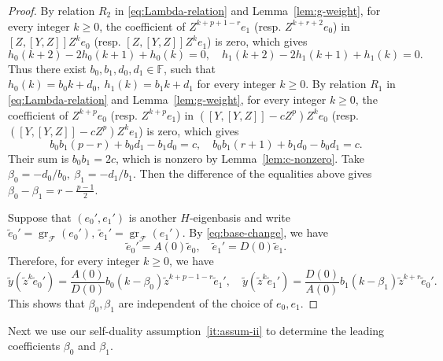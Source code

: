 \documentclass[11pt,a4paper]{article} %
\def\FF{\mathbb{F}}
\def\cF{\mathcal{F}}
\def\gr{\operatorname{gr}}
\begin{document}
\begin{proof}
    By relation $R_2$ in \eqref{eq:Lambda-relation} and Lemma~\ref{lem:g-weight}, for every integer $k\ge0$, the coefficient of $Z^{k+p+1-r}e_1$ (resp. $Z^{k+r+2}e_0$) in $[Z,[Y,Z]]Z^ke_0$ (resp. $[Z,[Y,Z]]Z^ke_1$) is zero, which gives
    \[
    h_0(k+2)-2h_0(k+1)+h_0(k)=0,\quad h_1(k+2)-2h_1(k+1)+h_1(k)=0.
    \]
    Thus there exist $b_0,b_1,d_0,d_1\in\FF$, such that $h_0(k)=b_0k+d_0,~h_1(k)=b_1k+d_1$ for every integer $k\ge0$. By relation $R_1$ in \eqref{eq:Lambda-relation} and Lemma~\ref{lem:g-weight}, for every integer $k\ge0$, the coefficient of $Z^{k+p}e_0$ (resp. $Z^{k+p}e_1$) in $([Y,[Y,Z]]-cZ^p)Z^ke_0$ (resp. $([Y,[Y,Z]]-cZ^p)Z^ke_1$) is zero, which gives
    \[
    b_0b_1(p-r)+b_0d_1-b_1d_0=c,\quad b_0b_1(r+1)+b_1d_0-b_0d_1=c.
    \]
    Their sum is $b_0b_1=2c$, which is nonzero by Lemma~\ref{lem:c-nonzero}. Take $\beta_0=-d_0/b_0,~\beta_1=-d_1/b_1$. Then the difference of the equalities above gives $ \beta_0-\beta_1=r-\frac{p-1}{2}$.

    Suppose that $(e_0',e_1')$ is another $H$-eigenbasis and write $\widetilde{e}_0'=\gr_{\cF}(e_0'),~\widetilde{e}_1'=\gr_{\cF}(e_1')$. By \eqref{eq:base-change}, we have 
    \[
    \widetilde{e}_0'=A(0)\widetilde{e}_0,\quad\widetilde{e}_1'=D(0)\widetilde{e}_1.
    \]
    Therefore, for every integer $k\ge0$, we have 
    \[
    \widetilde{y}(\widetilde{z}^k\widetilde{e}_0')=\frac{A(0)}{D(0)}b_0(k-\beta_0)\widetilde{z}^{k+p-1-r}\widetilde{e}_1',\quad\widetilde{y}(\widetilde{z}^k\widetilde{e}_1')=\frac{D(0)}{A(0)}b_1(k-\beta_1)\widetilde{z}^{k+r}\widetilde{e}_0'.
    \]
    This shows that $\beta_0,\beta_1$ are independent of the choice of $e_0,e_1$.
\end{proof}

Next we use our self-duality assumption~\ref{it:assum-ii} to determine the leading coefficients $\beta_0$ and $\beta_1$.
\end{document}
